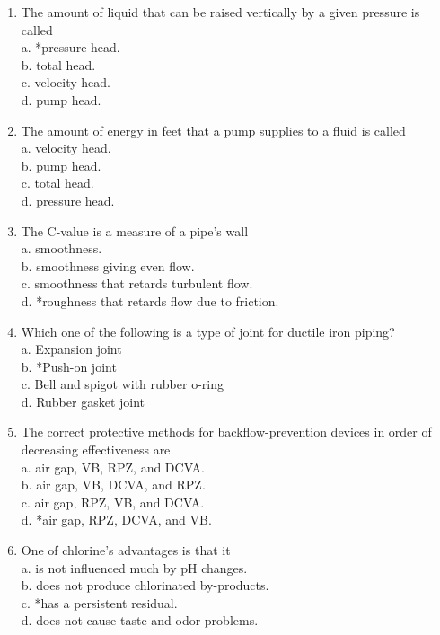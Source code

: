 \documentclass[10pt]{article}
\begin{document}
\begin{enumerate}
  \item The amount of liquid that can be raised vertically by a given pressure is called\\
a. *pressure head.\\
b. total head.\\
c. velocity head.\\
d. pump head.

  \item The amount of energy in feet that a pump supplies to a fluid is called\\
a. velocity head.\\
b. pump head.\\
c. total head.\\
d. pressure head.

  \item The C-value is a measure of a pipe's wall\\
a. smoothness.\\
b. smoothness giving even flow.\\
c. smoothness that retards turbulent flow.\\
d. *roughness that retards flow due to friction.

  \item Which one of the following is a type of joint for ductile iron piping?\\
a. Expansion joint\\
b. *Push-on joint\\
c. Bell and spigot with rubber o-ring\\
d. Rubber gasket joint

  \item The correct protective methods for backflow-prevention devices in order of decreasing effectiveness are\\
a. air gap, VB, RPZ, and DCVA.\\
b. air gap, VB, DCVA, and RPZ.\\
c. air gap, RPZ, VB, and DCVA.\\
d. *air gap, RPZ, DCVA, and VB.


  \item One of chlorine's advantages is that it\\
a. is not influenced much by $\mathrm{pH}$ changes.\\
b. does not produce chlorinated by-products.\\
c. *has a persistent residual.\\
d. does not cause taste and odor problems.


\end{enumerate}
\end{document}
